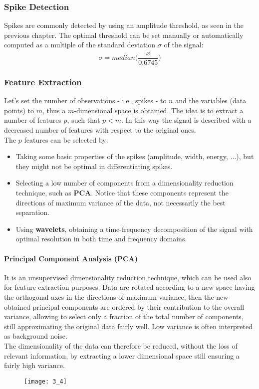 \subsubsection{Spike Detection}
Spikes are commonly detected by using an amplitude threshold, as seen in the previous
chapter. The optimal threshold can be set manually or automatically computed as a
multiple of the standard deviation \(\sigma\) of the signal:
\begin{equation*}
    \sigma=median\biggl(\frac{|x|}{0.6745}\biggr)
\end{equation*}
\subsubsection{Feature Extraction}
Let's set the number of observations - i.e., spikes - to \(n\) and the variables
(data points) to \(m\), thus a \(m\)-dimensional space is obtained. The idea is to
extract a number of features \(p\), such that \(p<m\). In this way the signal is
described with a decreased number of features with respect to the original ones.\\
The \(p\) features can be selected by:
\begin{itemize}
    \item Taking some basic properties of the spikes (amplitude, width, energy, ...),
          but they might not be optimal in differentiating spikes.
    \item Selecting a low number of components from a dimensionality reduction
          technique, such as \textbf{PCA}. Notice that these components represent the
          directions of maximum variance of the data, not necessarily the best separation.
    \item Using \textbf{wavelets}, obtaining a time-frequency decomposition of the
          signal with optimal resolution in both time and frequency domains.
\end{itemize}
\paragraph{Principal Component Analysis (PCA)}
It is an unsupervised dimensionality reduction technique, which can be used also for
feature extraction purposes. Data are rotated according to a new space having the
orthogonal axes in the directions of maximum variance, then the new obtained principal
components are ordered by their contribution to the overall variance, allowing to
select only a fraction of the total number of components, still approximating the
original data fairly well. Low variance is often interpreted as background noise.\\
The dimensionality of the data can therefore be reduced, without the loss of relevant
information, by extracting a lower dimensional space still ensuring a fairly high variance.
\begin{figure}[H]
    \texttt{[image: 3\_4]}
    \centering
\end{figure}
